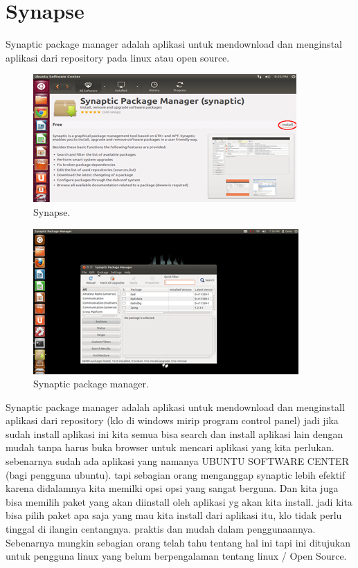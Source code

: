 \documentclass{jtetiproposalskripsi}
\begin{document}
\section{Synapse}
Synaptic package manager adalah aplikasi untuk mendownload dan menginstal aplikasi dari repository pada linux atau open source.
\begin{figure}[ht!]
  \centering
    \includegraphics{gambar/6}
    \caption{Synapse.}
    \label{wsn}
\end{figure}

\begin{figure}[ht!]
  \centering
    \includegraphics{gambar/7}
    \caption{Synaptic package manager.}
    \label{wsn}
\end{figure}

Synaptic package manager adalah aplikasi untuk mendownload dan menginstall aplikasi dari repository (klo di windows mirip program control panel) jadi jika sudah install aplikasi ini kita semua bisa search dan install aplikasi  lain dengan mudah tanpa harus buka browser untuk mencari aplikasi yang kita perlukan. sebenarnya sudah ada aplikasi yang namanya UBUNTU SOFTWARE CENTER (bagi pengguna ubuntu). tapi sebagian orang menganggap synaptic lebih efektif karena didalamnya kita memilki opsi opsi yang sangat berguna.
Dan kita juga bisa memilih paket yang akan diinstall oleh aplikasi yg akan kita install. jadi kita bisa pilih paket apa saja yang mau kita install dari aplikasi itu, klo tidak perlu tinggal di ilangin centangnya. praktis dan mudah dalam penggunaannya. Sebenarnya mungkin sebagian orang telah tahu tentang hal ini tapi ini ditujukan untuk pengguna linux yang belum berpengalaman tentang linux / Open Source.
\end{document}
